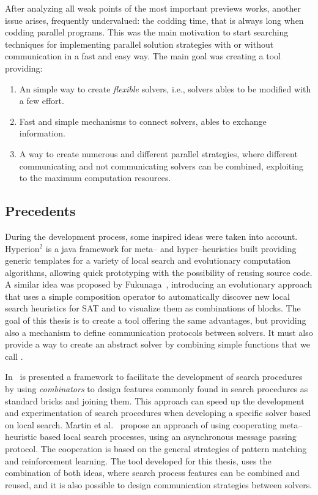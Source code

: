 After analyzing all weak points of the most important previews works, another issue arises, frequently undervalued: the codding time, that is always long when codding parallel programs. This was the main motivation to start searching techniques for implementing parallel solution strategies with or without communication in a fast and easy way. The main goal was creating a tool providing:
\begin{enumerate}
\item An simple way to create \textit{flexible} solvers, i.e., solvers ables to be modified with a few effort.
\item Fast and simple mechanisms to connect solvers, ables to exchange information.
\item A way to create numerous and different parallel strategies, where different communicating and not communicating solvers can be combined, exploiting to the maximum computation resources. 
\end{enumerate}

\subsection{Precedents}

During the development process, some inspired ideas were taken into account. {\sc Hyperion}$^2$ \cite{Brownlee2014} is a java framework for meta-- and hyper--heuristics built providing generic templates for a variety of local search and evolutionary computation algorithms, allowing quick prototyping with the possibility of reusing source code. A similar idea was proposed by Fukunaga~\cite{Fukunaga2008}, introducing an evolutionary approach that uses a simple composition operator to automatically discover new local search heuristics for SAT and to visualize them as combinations of blocks. The goal of this thesis is to create a tool offering the same advantages, but providing also a mechanism to define communication protocols between solvers. It must also provide a way to create an abstract solver by combining simple functions that we call \ms.  

In~\cite{Landtsheer2015} is presented a framework to facilitate the development of search procedures by using \textit{combinators} to design features commonly found in search procedures as standard bricks and joining them. This approach can speed up the development and experimentation of search procedures when developing a specific solver based on local search. Martin et al.~\cite{Martin2016} propose an approach of using cooperating meta--heuristic based local search processes, using an asynchronous message passing protocol. The cooperation is based on the general strategies of pattern matching and reinforcement learning. The tool developed for this thesis, uses the combination of both ideas, where search process features can be combined and reused, and it is also possible to design communication strategies between solvers.


